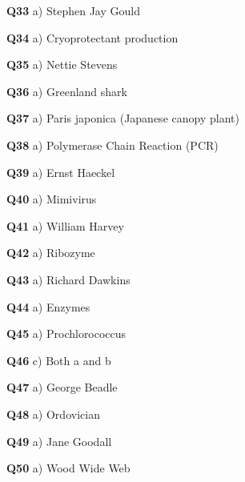 \textbf{Q33} a) Stephen Jay Gould\par
\textbf{Q34} a) Cryoprotectant production\par
\textbf{Q35} a) Nettie Stevens\par
\textbf{Q36} a) Greenland shark\par
\textbf{Q37} a) Paris japonica (Japanese canopy plant)\par
\textbf{Q38} a) Polymerase Chain Reaction (PCR)\par
\textbf{Q39} a) Ernst Haeckel\par
\textbf{Q40} a) Mimivirus\par
\textbf{Q41} a) William Harvey\par
\textbf{Q42} a) Ribozyme\par
\textbf{Q43} a) Richard Dawkins\par
\textbf{Q44} a) Enzymes\par
\textbf{Q45} a) Prochlorococcus\par
\textbf{Q46} c) Both a and b\par
\textbf{Q47} a) George Beadle\par
\textbf{Q48} a) Ordovician\par
\textbf{Q49} a) Jane Goodall\par
\textbf{Q50} a) Wood Wide Web\par